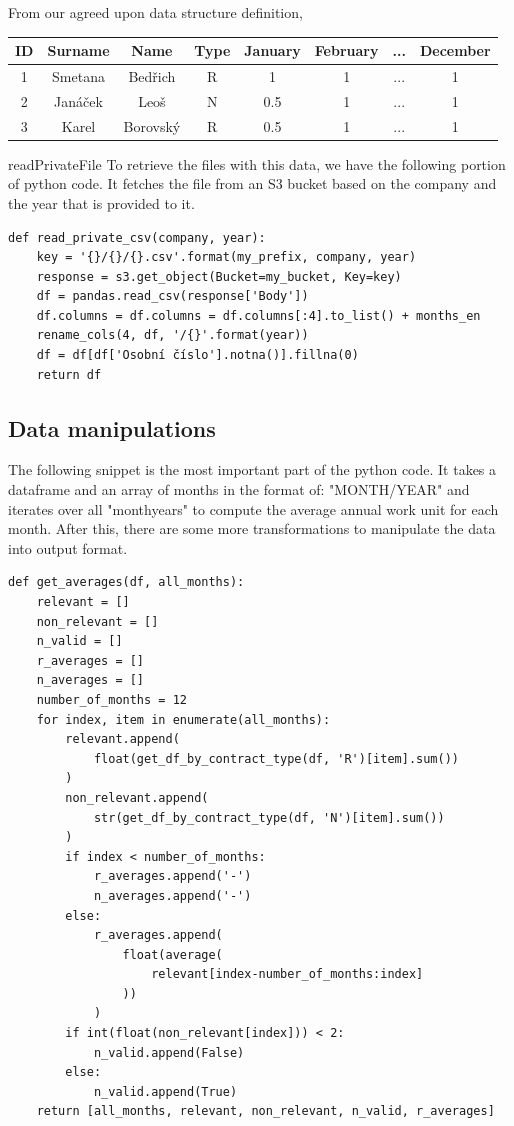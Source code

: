 \documentclass[12pt,oneside]{fithesis2}
\begin{document}
From our agreed upon data structure definition, 
\begin{center}
\begin{tabular}{ |c|c|c|c|c|c|c|c| } 
\hline
ID & Surname & Name & Type & January & February & ... & December \\
\hline
1 & Smetana & Bedřich & R & 1 & 1 & ... & 1\\ 
2 & Janáček & Leoš & N & 0.5 & 1 & ... & 1\\ 
3 & Karel & Borovský & R & 0.5 & 1 & ... & 1\\ 
\hline
\end{tabular}
\end{center}

readPrivateFile To retrieve the files with this data, we have the following portion of python code. It fetches the file from an S3 bucket based on the company and the year that is provided to it.

\begin{verbatim}
def read_private_csv(company, year):
    key = '{}/{}/{}.csv'.format(my_prefix, company, year)
    response = s3.get_object(Bucket=my_bucket, Key=key)
    df = pandas.read_csv(response['Body'])
    df.columns = df.columns = df.columns[:4].to_list() + months_en
    rename_cols(4, df, '/{}'.format(year))
    df = df[df['Osobní číslo'].notna()].fillna(0)
    return df
\end{verbatim}

\subsection{Data manipulations}
The following snippet is the most important part of the python code. It takes a dataframe and an array of months in the format of: "MONTH/YEAR" and iterates over all "monthyears" to compute the average annual work unit for each month. After this, there are some more transformations to manipulate the data into output format.

\begin{verbatim}
def get_averages(df, all_months):
    relevant = []
    non_relevant = []
    n_valid = []
    r_averages = []
    n_averages = []
    number_of_months = 12
    for index, item in enumerate(all_months):
        relevant.append(
            float(get_df_by_contract_type(df, 'R')[item].sum())
        )
        non_relevant.append(
            str(get_df_by_contract_type(df, 'N')[item].sum())
        )
        if index < number_of_months:
            r_averages.append('-')
            n_averages.append('-')
        else:
            r_averages.append(
                float(average(
                    relevant[index-number_of_months:index]
                ))
            )
        if int(float(non_relevant[index])) < 2:
            n_valid.append(False)
        else:
            n_valid.append(True)
    return [all_months, relevant, non_relevant, n_valid, r_averages]
\end{verbatim}
\end{document}
